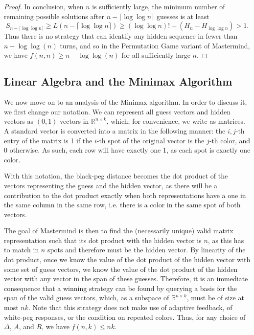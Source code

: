 \documentclass[12pt, a4paper]{article}
\newcommand{\R}{\mathbb{R}}           %
\begin{document}
\begin{proof}
 	In conclusion, when $n$ is sufficiently large, the minimum number of remaining
	possible solutions after $n - \lceil \log\log n \rceil$ guesses is at least
		\begin{equation*}
		S_{n - \lceil \log\log n \rceil} \geq L(n - \lceil \log\log n \rceil)
		 \ge (\log\log n)! - (H_n - H_{\log\log n})
		 > 1.
		\end{equation*}
	Thus there is no strategy that can identify any hidden sequence in fewer than $n-\log\log(n)$ turns, and so in the Permutation Game variant of Mastermind, we have $f(n, n)\ge n - \log\log(n)$ for all sufficiently large $n$.
	\end{proof}

\subsection{Linear Algebra and the Minimax Algorithm}
We now move on to an analysis of the Minimax algorithm. In order to discuss it, we first change our notation. We can represent all guess vectors and hidden vectors as $(0,1)$-vectors in $\R^{n\times k}$, which, for convenience, we write as matrices. A standard vector is converted into a matrix in the following manner: the $i,j$-th entry of the matrix is 1 if the $i$-th spot of the original vector is the $j$-th color, and 0 otherwise. As such, each row will have exactly one 1, as each spot is exactly one color.

With this notation, the black-peg distance becomes the dot product of the vectors representing the guess and the hidden vector, as there will be a contribution to the dot product exactly when both representations have a one in the same column in the same row, i.e. there is a color in the same spot of both vectors. 

The goal of Mastermind is then to find the (necessarily unique) valid matrix representation such that its dot product with the hidden vector is $n$, as this has to match in $n$ spots and therefore must be the hidden vector. By linearity of the dot product, once we know the value of the dot product of the hidden vector with some set of guess vectors, we know the value of the dot product of the hidden vector with any vector in the span of these guesses. Therefore, it is an immediate consequence that a winning strategy can be found by querying a basis for the span of the valid guess vectors, which, as a subspace of $\R^{n\times k}$, must be of size at most $nk$. Note that this strategy does not make use of adaptive feedback, of white-peg responses, or the condition on repeated colors. Thus, for any choice of $\Delta$, $A$, and $R$, we have $f(n,k) \leq nk$.
\end{document}
